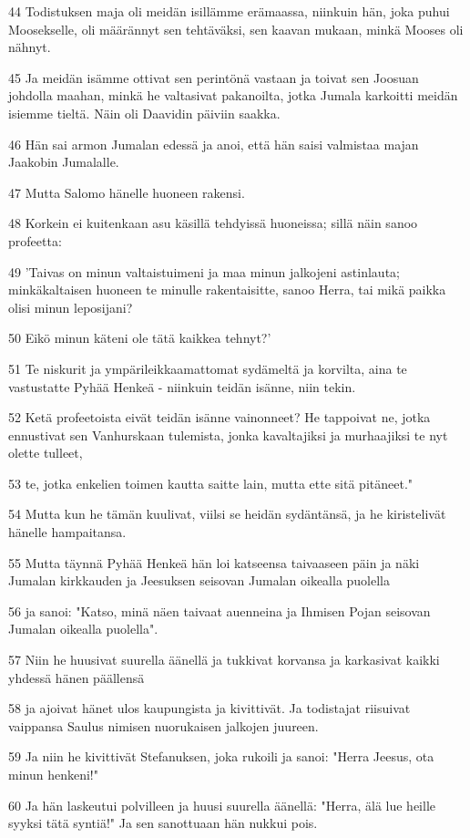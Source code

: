 \par 44 Todistuksen maja oli meidän isillämme erämaassa, niinkuin hän, joka puhui Moosekselle, oli määrännyt sen tehtäväksi, sen kaavan mukaan, minkä Mooses oli nähnyt.
\par 45 Ja meidän isämme ottivat sen perintönä vastaan ja toivat sen Joosuan johdolla maahan, minkä he valtasivat pakanoilta, jotka Jumala karkoitti meidän isiemme tieltä. Näin oli Daavidin päiviin saakka.
\par 46 Hän sai armon Jumalan edessä ja anoi, että hän saisi valmistaa majan Jaakobin Jumalalle.
\par 47 Mutta Salomo hänelle huoneen rakensi.
\par 48 Korkein ei kuitenkaan asu käsillä tehdyissä huoneissa; sillä näin sanoo profeetta:
\par 49 'Taivas on minun valtaistuimeni ja maa minun jalkojeni astinlauta; minkäkaltaisen huoneen te minulle rakentaisitte, sanoo Herra, tai mikä paikka olisi minun leposijani?
\par 50 Eikö minun käteni ole tätä kaikkea tehnyt?'
\par 51 Te niskurit ja ympärileikkaamattomat sydämeltä ja korvilta, aina te vastustatte Pyhää Henkeä - niinkuin teidän isänne, niin tekin.
\par 52 Ketä profeetoista eivät teidän isänne vainonneet? He tappoivat ne, jotka ennustivat sen Vanhurskaan tulemista, jonka kavaltajiksi ja murhaajiksi te nyt olette tulleet,
\par 53 te, jotka enkelien toimen kautta saitte lain, mutta ette sitä pitäneet."
\par 54 Mutta kun he tämän kuulivat, viilsi se heidän sydäntänsä, ja he kiristelivät hänelle hampaitansa.
\par 55 Mutta täynnä Pyhää Henkeä hän loi katseensa taivaaseen päin ja näki Jumalan kirkkauden ja Jeesuksen seisovan Jumalan oikealla puolella
\par 56 ja sanoi: "Katso, minä näen taivaat auenneina ja Ihmisen Pojan seisovan Jumalan oikealla puolella".
\par 57 Niin he huusivat suurella äänellä ja tukkivat korvansa ja karkasivat kaikki yhdessä hänen päällensä
\par 58 ja ajoivat hänet ulos kaupungista ja kivittivät. Ja todistajat riisuivat vaippansa Saulus nimisen nuorukaisen jalkojen juureen.
\par 59 Ja niin he kivittivät Stefanuksen, joka rukoili ja sanoi: "Herra Jeesus, ota minun henkeni!"
\par 60 Ja hän laskeutui polvilleen ja huusi suurella äänellä: "Herra, älä lue heille syyksi tätä syntiä!" Ja sen sanottuaan hän nukkui pois.

